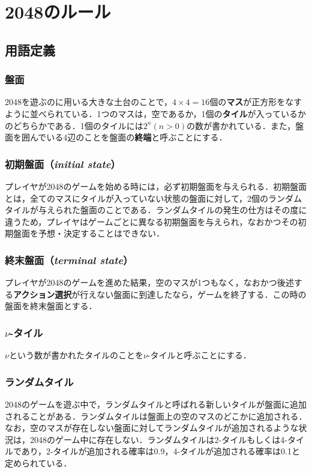 \documentclass{suribt}
\begin{document}
\section{2048のルール}
\subsection{用語定義}
\subsubsection{盤面}
2048を遊ぶのに用いる大きな土台のことで，$4 \times 4 = 16$個の\textbf{マス}が正方形をなすように並べられている．1つのマスは，空であるか，1個の\textbf{タイル}が入っているかのどちらかである．1個のタイルには$2^n (n>0)$の数が書かれている．また，盤面を囲んでいる4辺のことを盤面の\textbf{終端}と呼ぶことにする．

\subsubsection{初期盤面（\textit{initial state}）}
プレイヤが2048のゲームを始める時には，必ず初期盤面を与えられる．初期盤面とは，全てのマスにタイルが入っていない状態の盤面に対して，2個のランダムタイルが与えられた盤面のことである．ランダムタイルの発生の仕方はその度に違うため，プレイヤはゲームごとに異なる初期盤面を与えられ，なおかつその初期盤面を予想・決定することはできない．

\subsubsection{終末盤面（\textit{terminal state}）}
プレイヤが2048のゲームを進めた結果，空のマスが1つもなく，なおかつ後述する\textbf{アクション選択}が行えない盤面に到達したなら，ゲームを終了する．この時の盤面を終末盤面とする．

\subsubsection{${\nu}$-タイル}
${\nu}$という数が書かれたタイルのことを${\nu}$-タイルと呼ぶことにする．

\subsubsection{ランダムタイル}
2048のゲームを遊ぶ中で，ランダムタイルと呼ばれる新しいタイルが盤面に追加されることがある．ランダムタイルは盤面上の空のマスのどこかに追加される．なお，空のマスが存在しない盤面に対してランダムタイルが追加されるような状況は，2048のゲーム中に存在しない．ランダムタイルは2-タイルもしくは4-タイルであり，2-タイルが追加される確率は0.9，4-タイルが追加される確率は0.1と定められている．
\end{document}
